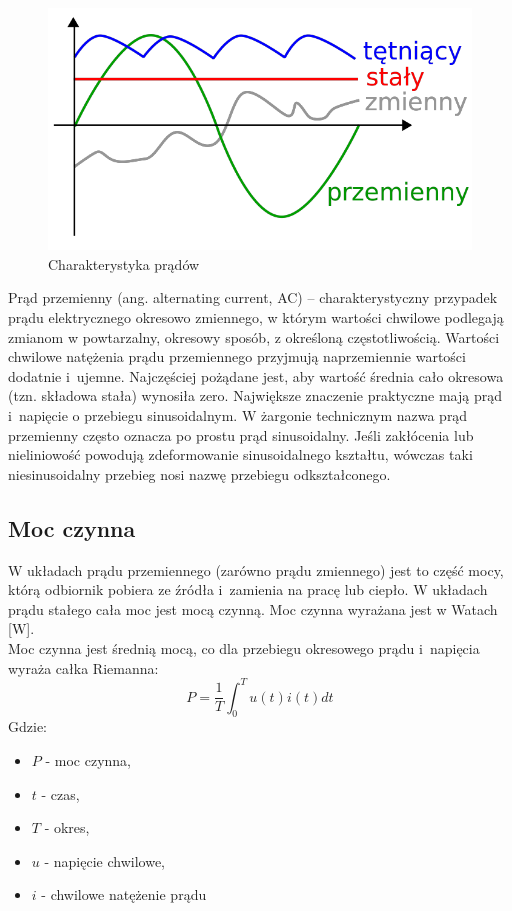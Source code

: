 \documentclass[12pt]{article}
\begin{document}
\begin{figure}[H]
  \centering
  \includegraphics[scale=0.5]{img/current_types.png}
  \caption{Charakterystyka prądów}
  \label{fig:my_label}
\end{figure}

Prąd przemienny (ang. alternating current, AC) – charakterystyczny przypadek prądu elektrycznego okresowo zmiennego, w którym wartości chwilowe podlegają zmianom w powtarzalny, okresowy sposób, z określoną częstotliwością. Wartości chwilowe natężenia prądu przemiennego przyjmują naprzemiennie wartości dodatnie i~ujemne. Najczęściej pożądane jest, aby wartość średnia cało okresowa (tzn. składowa stała) wynosiła zero. Największe znaczenie praktyczne mają prąd i~napięcie o przebiegu sinusoidalnym. W żargonie technicznym nazwa prąd przemienny często oznacza po prostu prąd sinusoidalny. Jeśli zakłócenia lub nieliniowość powodują zdeformowanie sinusoidalnego kształtu, wówczas taki niesinusoidalny przebieg nosi nazwę przebiegu odkształconego.
\subsection{Moc czynna}
 W układach prądu przemiennego (zarówno prądu zmiennego) jest to część mocy, którą odbiornik pobiera ze źródła i~zamienia na pracę lub ciepło. W układach prądu stałego cała moc jest mocą czynną. Moc czynna wyrażana jest w Watach [W].\\
 Moc czynna jest średnią mocą, co dla przebiegu okresowego prądu i~napięcia wyraża całka Riemanna:
 \begin{equation}
  P={\frac {1}{T}}\int _{0}^{T}u(t)i(t)dt
\end{equation}
\newpage
 Gdzie:
 \begin{itemize}[noitemsep]
     \item $P$ - moc czynna,
     \item $t$ - czas,
     \item $T$ - okres,
     \item $u$ - napięcie chwilowe,
     \item $i$ - chwilowe natężenie prądu
 \end{itemize}
\end{document}
